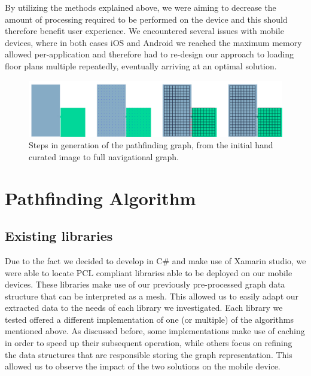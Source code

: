 \documentclass[12pt,a4paper]{report}
\begin{document}
By utilizing the methods explained above, we were aiming to decrease the amount of processing required to be performed on the device and this should therefore benefit user experience. We encountered several issues with mobile devices, where in both cases iOS and Android we reached the maximum memory allowed per-application and therefore had to re-design our approach to loading floor plans multiple repeatedly, eventually arriving at an optimal solution.
\begin{figure}[h]
\center
\includegraphics[trim=0 0 0 0, clip,width=\textwidth,height=\textheight,keepaspectratio]{images/graphGeneration.pdf}
\caption{Steps in generation of the pathfinding graph, from the initial hand curated image to full navigational graph.}
\label{fig:nav_graph}
\end{figure}

\section{Pathfinding Algorithm}

\subsection{Existing libraries}
Due to the fact we decided to develop in C\# and make use of Xamarin studio, we were able to locate PCL compliant libraries able to be deployed on our mobile devices. These libraries make use of our previously pre-processed graph data structure that can be interpreted as a mesh. This allowed us to easily adapt our extracted data to the needs of each library we investigated. Each library we tested offered a different implementation of one (or multiple) of the algorithms mentioned above. As discussed before, some implementations make use of caching in order to speed up their subsequent operation, while others focus on refining the data structures that are responsible storing the graph representation. This allowed us to observe the impact of the two solutions on the mobile device.
\end{document}
